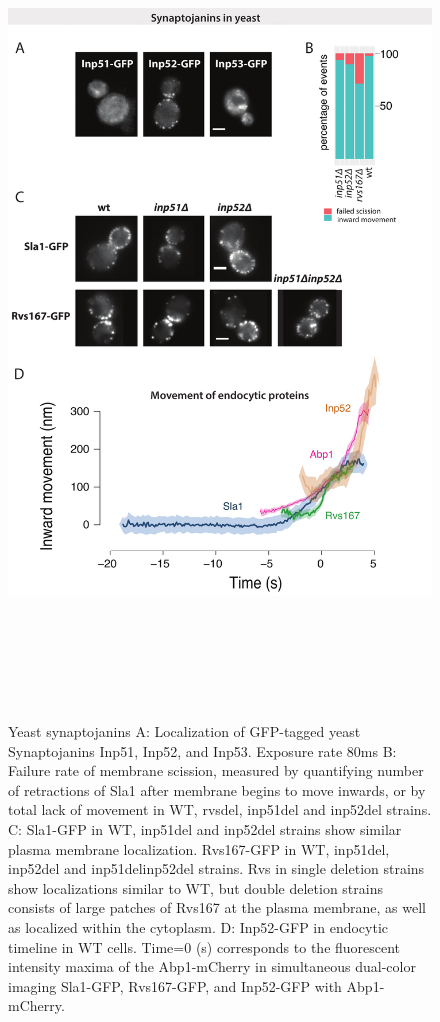 		\begin{figure}
		\centering
		\includegraphics[width=22cm,height=22cm,keepaspectratio]{figures/results_final/inp}
		\caption{Yeast synaptojanins 
		{A: Localization of GFP-tagged yeast Synaptojanins Inp51, Inp52, and Inp53. Exposure rate 80ms
		B: Failure rate of membrane scission, measured by quantifying number of retractions of Sla1 after membrane begins to move inwards, or by total lack of movement in WT, rvsdel, inp51del and inp52del strains.
		C: Sla1-GFP in WT, inp51del and inp52del strains show similar plasma membrane localization. Rvs167-GFP in WT, inp51del, inp52del and inp51delinp52del strains. Rvs in single deletion strains show localizations similar to WT, but double deletion strains consists of large patches of Rvs167 at the plasma membrane, as well as localized within the cytoplasm. 
		D: Inp52-GFP in endocytic timeline in WT cells. Time=0 (s) corresponds to the fluorescent intensity maxima of the Abp1-mCherry in simultaneous dual-color imaging Sla1-GFP, Rvs167-GFP, and Inp52-GFP with Abp1-mCherry. 
		}	
		\label{fig4_inp}}
		\end{figure}
		
